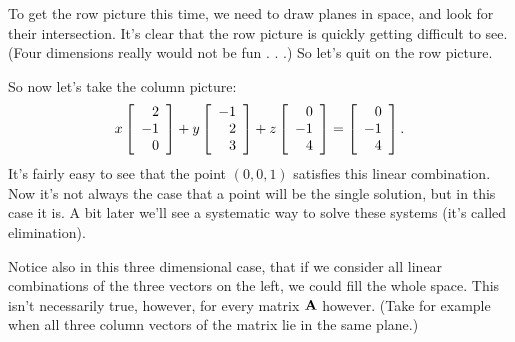 To get the row picture this time, we need to draw planes in space, and look for their intersection. It's clear that the row picture is quickly getting difficult to see. (Four dimensions really would not be fun . . .) So let's quit on the row picture. 

So now let's take the column picture:
\[ x\left[ \begin{array}{rrrrrrrrrrrrrrrrrrrrrrrrr} 2\\-1\\0\\ \end{array} \right]+y\left[ \begin{array}{rrrrrrrrrrrrrrrrrrrrrrrrr} -1\\2\\3\\ \end{array} \right]+z\left[ \begin{array}{rrrrrrrrrrrrrrrrrrrrrrrrr} 0\\-1\\4\\ \end{array} \right]=\left[ \begin{array}{rrrrrrrrrrrrrrrrrrrrrrrrr} 0\\-1\\4\\ \end{array} \right]. \]
It's fairly easy to see that the point $(0,0,1)$ satisfies this linear combination. Now it's not always the case that a point will be the single solution, but in this case it is. A bit later we'll see a systematic way to solve these systems (it's called elimination). 

Notice also in this three dimensional case, that if we consider all linear combinations of the three vectors on the left, we could fill the whole space.
This isn't necessarily true, however, for every matrix $\boldsymbol{\mathbf{A}}$ however. (Take for example when all three column vectors of the matrix lie in the same plane.) 
\eex


